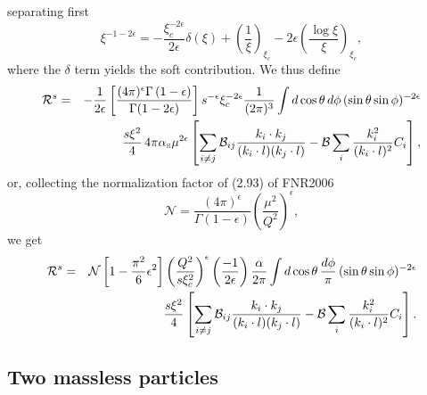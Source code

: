 \documentclass[paper]{JHEP3}
\newcommand\sss{\mathchoice%
{\displaystyle}%
{\scriptstyle}%
{\scriptscriptstyle}%
{\scriptscriptstyle}%
}
\newcommand\matR{{\cal R}}
\newcommand\as{\alpha_{\sss\rm S}}
\begin{document}
separating first
\begin{equation}
  \xi^{- 1 - 2 \epsilon} = - \frac{\xi_c^{- 2 \epsilon}}{2 \epsilon} \delta
  (\xi) + \left( \frac{1}{\xi} \right)_{\xi_c} - 2 \epsilon \left( \frac{\log
  \xi}{\xi} \right)_{\xi_c},
\end{equation}
where the $\delta$ term yields the soft contribution. We thus define
\begin{eqnarray}
  \matR^s & = & - \frac{1}{2 \epsilon} \left[ \frac{(4 \pi)^{\epsilon} \Gamma
  \left( 1 - \epsilon \right)}{\Gamma (1 - 2 \epsilon)} \right] s^{- \epsilon}
  \xi_c^{- 2 \epsilon} \frac{1}{(2 \pi)^3} \int d \cos \theta \,d \phi\, (\sin
  \theta \sin \phi)^{- 2 \epsilon}  \nonumber\\
  &  &  \frac{s \xi^2}{4} \,4 \pi \as \mu^{2 \epsilon} \left[
  \sum_{i \neq 
  j} \mathcal{B}_{i j} \frac{k_i \cdot k_j}{(k_i \cdot l) (k_j \cdot l)} -
  \mathcal{B} \sum_i \frac{k_i^2}{(k_i \cdot l)^2} C_i \right], 
\end{eqnarray}
or, collecting the normalization factor of (2.93) of FNR2006
\[ \mathcal{N} = \frac{(4 \pi)^{\epsilon} }{\Gamma (1 - \epsilon)} \left(
   \frac{\mu^2}{Q^2} \right)^{\epsilon}, \]
we get
\begin{eqnarray}
  \matR^s & = & \mathcal{N}  \left[ 1 - \frac{\pi^2}{6} \epsilon^2 \right]
  \left( 
  \frac{Q^2}{s \xi_c^2} \right)^{\epsilon} \left( \frac{- 1}{2 \epsilon}
  \right) \frac{\alpha}{2 \pi} \int d \cos \theta\, \frac{d \phi}{\pi}\,
  (\sin \theta \sin \phi)^{- 2 \epsilon}  \nonumber\\
  &  & \frac{s \xi^2 }{4} \left[ \sum_{i \neq j} \mathcal{B}_{i j}
  \frac{k_i 
  \cdot k_j}{(k_i \cdot l) (k_j \cdot l)} - \mathcal{B} \sum_i
  \frac{k_i^2}{(k_i \cdot l)^2} C_i \right]. 
\end{eqnarray}


\subsection{Two massless particles}
\end{document}

